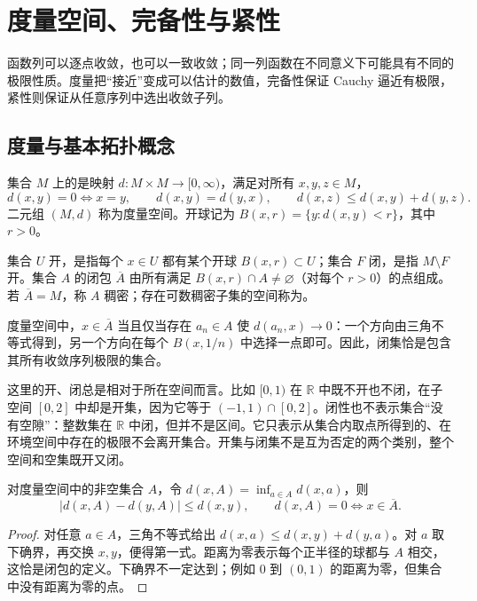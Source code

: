 \documentclass[UTF8,12pt,a4paper,fontset=fandol]{ctexbook}
\begin{document}
\chapter{度量空间、完备性与紧性}
\label{chap:fa-metric}

函数列可以逐点收敛，也可以一致收敛；同一列函数在不同意义下可能具有不同的极限性质。度量把“接近”变成可以估计的数值，完备性保证 Cauchy 逼近有极限，紧性则保证从任意序列中选出收敛子列。

\section{度量与基本拓扑概念}
\begin{definition}
集合 $M$ 上的是映射 $d:M\times M\to[0,\infty)$，满足对所有 $x,y,z\in M$，
\[
 d(x,y)=0\iff x=y,\qquad d(x,y)=d(y,x),\qquad
 d(x,z)\leq d(x,y)+d(y,z).
\]
二元组 $(M,d)$ 称为度量空间。开球记为 $B(x,r)=\{y:d(x,y)<r\}$，其中 $r>0$。
\end{definition}
集合 $U$ 开，是指每个 $x\in U$ 都有某个开球 $B(x,r)\subset U$；集合 $F$ 闭，是指 $M\setminus F$ 开。集合 $A$ 的闭包 $\overline A$ 由所有满足 $B(x,r)\cap A\ne\varnothing$（对每个 $r>0$）的点组成。若 $\overline A=M$，称 $A$ 稠密；存在可数稠密子集的空间称为。

度量空间中，$x\in\overline A$ 当且仅当存在 $a_n\in A$ 使 $d(a_n,x)\to0$：一个方向由三角不等式得到，另一个方向在每个 $B(x,1/n)$ 中选择一点即可。因此，闭集恰是包含其所有收敛序列极限的集合。

这里的开、闭总是相对于所在空间而言。比如 $[0,1)$ 在 $\mathbb R$ 中既不开也不闭，在子空间 $[0,2]$ 中却是开集，因为它等于 $(-1,1)\cap[0,2]$。闭性也不表示集合“没有空隙”：整数集在 $\mathbb R$ 中闭，但并不是区间。它只表示从集合内取点所得到的、在环境空间中存在的极限不会离开集合。开集与闭集不是互为否定的两个类别，整个空间和空集既开又闭。

\begin{proposition}[距离函数的连续性]\label{prop:fa-distance-lipschitz}
对度量空间中的非空集合 $A$，令 $d(x,A)=\inf_{a\in A}d(x,a)$，则
\[
 |d(x,A)-d(y,A)|\leq d(x,y),\qquad
 d(x,A)=0\iff x\in\overline A.
\]
\end{proposition}
\begin{proof}
对任意 $a\in A$，三角不等式给出 $d(x,a)\leq d(x,y)+d(y,a)$。对 $a$ 取下确界，再交换 $x,y$，便得第一式。距离为零表示每个正半径的球都与 $A$ 相交，这恰是闭包的定义。下确界不一定达到；例如 $0$ 到 $(0,1)$ 的距离为零，但集合中没有距离为零的点。
\end{proof}
\end{document}
